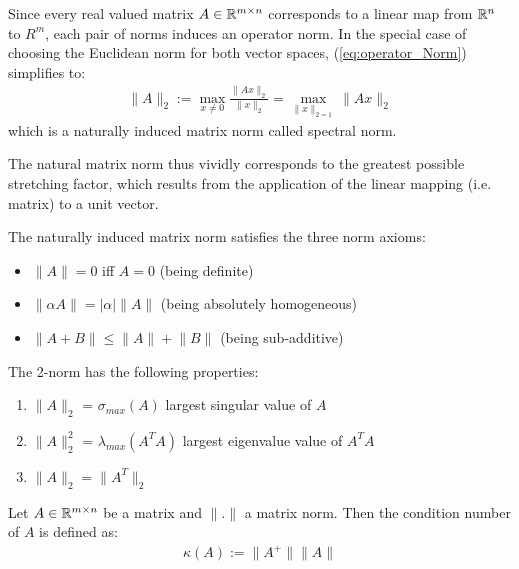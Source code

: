 \begin{remark}
	Since every real valued matrix $A \in \mathbb{R}^{m \times n}$ corresponds to a linear map from $\mathbb{R}^n$ to $R^m$, each pair of norms induces an operator norm. In the special case of choosing the Euclidean norm for both vector spaces, (\ref{eq:operator_Norm}) simplifies to:
	\begin{align}\label{eq:matrix_Norm}
		\lVert A \rVert_2 := \max_{x \neq 0} \frac{\lVert Ax \rVert_2}{\lVert x \rVert_2} = \max_{\lVert x \rVert_{2 = 1}} \lVert Ax \rVert_2
	\end{align}	
	which is a naturally induced matrix norm called spectral norm. 
\end{remark}

The natural matrix norm thus vividly corresponds to the greatest possible stretching factor, which results from the application of the linear mapping (i.e. matrix) to a unit vector.

\begin{remark}
	The naturally induced matrix norm satisfies the three norm axioms:
	\begin{itemize}
		\item $\lVert A \rVert = 0$ iff $A = 0$ \hfill (being definite)
		\item $\lVert \alpha A \rVert = |\alpha| \lVert A \rVert$ \hfill (being absolutely homogeneous)
		\item $\lVert A + B  \rVert \leq \lVert A \rVert + \lVert B \rVert$ \hfill (being sub-additive)
	\end{itemize}
\end{remark}

\begin{remark}
	The 2-norm has the following properties:
	\begin{enumerate}
		\item $\lVert A \rVert_2$ = $\sigma_{max}(A)$ \hfill largest singular value of $A$
		\item $\lVert A \rVert_2^2$ = $\lambda_{max}(A^T A)$ \hfill largest eigenvalue value of $A^T A$
		\item $\lVert A \rVert_2 = \lVert A^T \rVert_2$
	\end{enumerate}
\end{remark}

\begin{definition}
	Let $A \in \mathbb{R}^{m \times n}$ be a matrix and $\lVert . \rVert$ a matrix norm. Then the condition number of $A$ is defined as:	
	\begin{align}\label{eq:condition_number}
	\kappa(A) := \lVert A^+ \rVert \lVert A \rVert
	\end{align}
\end{definition}

